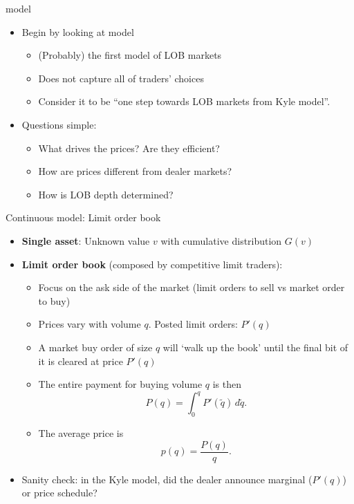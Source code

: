 \documentclass[english,10pt
,aspectratio=169
]{beamer}
\begin{document}

\begin{frame}{\cite{glosten_is_1994} model}
	\begin{itemize}
		\item Begin by looking at \cite{glosten_is_1994} model
		\begin{itemize}
			\item (Probably) the first model of LOB markets
			\item Does not capture all of traders' choices
			\item Consider it to be ``one step towards LOB markets from Kyle model''.
		\end{itemize}
		\item Questions simple:
		\begin{itemize}
			\item What drives the prices? Are they efficient?
			\item How are prices different from dealer markets?
			\item How is LOB depth determined?
		\end{itemize}
	\end{itemize}
\end{frame}


\begin{frame}{Continuous model: Limit order book}
\begin{itemize}
	\item \textbf{Single asset}: Unknown value $v$ with cumulative distribution  $G(v)$
	\item \textbf{Limit order book} (composed by competitive limit traders): 
	\begin{itemize}
		\item Focus on the ask side of the market (limit orders to sell vs market order to buy)
		\item Prices vary with volume $q$. Posted limit orders: $P'(q)$
		\item A market buy order of size $q$ will `walk up the book' until the final bit of it is cleared at price $P'(q)$
		\item The entire payment for buying volume $q$ is then
		\[
		P(q) = \int_0^q P'(\tilde{q}) \, d\tilde{q}.
		\]
		\item The average price is 
		\[
		p(q) = \frac{P(q)}{q}.
		\]
	\end{itemize}
	\pause
	\item Sanity check: in the Kyle model, did the dealer announce \alert{marginal ($P'(q)$)} or  price schedule?
\end{itemize}
\end{frame}
\end{document}
